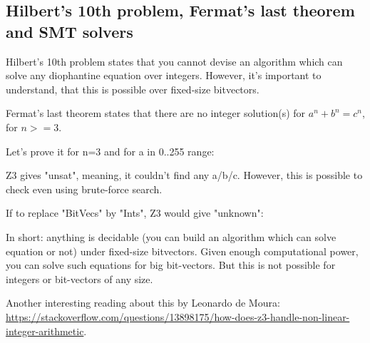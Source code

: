 \subsection{Hilbert's 10th problem, Fermat’s last theorem and SMT solvers}

Hilbert's 10th problem states that you cannot devise an algorithm which can solve any diophantine equation over integers.
However, it's important to understand, that this is possible over fixed-size bitvectors.

Fermat's last theorem states that there are no integer solution(s) for $a^n + b^n = c^n$, for $n>=3$.

Let's prove it for n=3 and for a in 0..255 range:



Z3 gives "unsat", meaning, it couldn't find any a/b/c.
However, this is possible to check even using brute-force search.

If to replace "BitVecs" by "Ints", Z3 would give "unknown":



In short: anything is decidable (you can build an algorithm which can solve equation or not) under fixed-size bitvectors.
Given enough computational power, you can solve such equations for big bit-vectors.
But this is not possible for integers or bit-vectors of any size.

Another interesting reading about this by Leonardo de Moura:
\url{https://stackoverflow.com/questions/13898175/how-does-z3-handle-non-linear-integer-arithmetic}.

